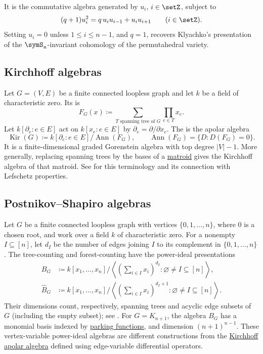 It is the commutative algebra generated by $u_i$, $i\in\setZ$, subject to
\[
   (q+1)u_i^2 = q\, u_i u_{i-1} + u_i u_{i+1}\qquad (i\in\setZ).
\]
Setting $u_i=0$ unless $1\leq i\leq n-1$, and $q=1$, recovers Klyachko's
presentation of the $\symS_n$-invariant cohomology of the permutahedral
variety.

\subsection[kirchhoffAlgebra]{Kirchhoff algebras}

Let $G=(V,E)$ be a finite connected loopless graph and let $k$ be a field
of characteristic zero. Its  is
\[
 F_G(x)\coloneqq\sum_{T\text{ spanning tree of }G}\prod_{e\in T}x_e.
\]
Let $k[\partial_e:e\in E]$ act on $k[x_e:e\in E]$ by
$\partial_e=\partial/\partial x_e$.
The  is the apolar algebra
\[
 \operatorname{Kir}(G)\coloneqq
 k[\partial_e:e\in E]/\operatorname{Ann}(F_G),
 \qquad
 \operatorname{Ann}(F_G)=\{D:D(F_G)=0\}.
\]
It is a finite-dimensional graded Gorenstein algebra with top degree
$|V|-1$. More generally, replacing spanning trees by the bases of a
\hyperref[matroid]{matroid} gives the Kirchhoff algebra of that matroid.
See \cite[Sec.~1]{Akama2026Kirchhoff} for this terminology and its connection
with Lefschetz properties.

\subsection[postnikovShapiroAlgebra]{Postnikov--Shapiro algebras}

Let $G$ be a finite connected loopless graph with vertices
$\{0,1,\dotsc,n\}$, where $0$ is a chosen root, and work over a field $k$
of characteristic zero. For a nonempty $I\subseteq[n]$, let $d_I$ be the
number of edges joining $I$ to its complement in $\{0,1,\dotsc,n\}$.
The tree-counting and forest-counting 
have the power-ideal presentations
\begin{align*}
 B_G&\coloneqq k[x_1,\dotsc,x_n]/
 \left\langle\left(\sum_{i\in I}x_i\right)^{d_I}:
 \varnothing\ne I\subseteq[n]\right\rangle,\\
 \widehat B_G&\coloneqq k[x_1,\dotsc,x_n]/
 \left\langle\left(\sum_{i\in I}x_i\right)^{d_I+1}:
 \varnothing\ne I\subseteq[n]\right\rangle.
\end{align*}
Their dimensions count, respectively, spanning trees and acyclic edge
subsets of $G$ (including the empty subset); see
\cite[Secs.~3 and 11]{PostnikovShapiro2004}.
For $G=K_{n+1}$, the algebra $B_G$ has a monomial basis indexed by
\hyperref[parkingFunctions]{parking functions}, and dimension $(n+1)^{n-1}$.
These vertex-variable power-ideal algebras are different constructions from
the \hyperref[kirchhoffAlgebra]{Kirchhoff apolar algebra} defined using
edge-variable differential operators.

